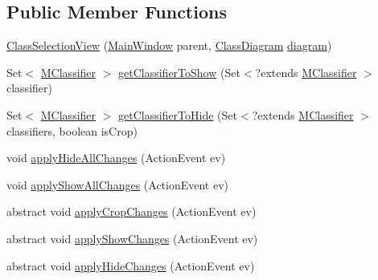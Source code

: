\subsection*{Public Member Functions}
\begin{DoxyCompactItemize}
\item 
\hyperlink{classorg_1_1tzi_1_1use_1_1gui_1_1views_1_1selection_1_1_class_selection_view_a13fa891c0471a910fcb2ef951f3b9fdc}{Class\-Selection\-View} (\hyperlink{classorg_1_1tzi_1_1use_1_1gui_1_1main_1_1_main_window}{Main\-Window} parent, \hyperlink{classorg_1_1tzi_1_1use_1_1gui_1_1views_1_1diagrams_1_1classdiagram_1_1_class_diagram}{Class\-Diagram} \hyperlink{classorg_1_1tzi_1_1use_1_1gui_1_1views_1_1selection_1_1_class_selection_view_a8cc2a534904dde3a8f6bebf8c646934d}{diagram})
\item 
Set$<$ \hyperlink{interfaceorg_1_1tzi_1_1use_1_1uml_1_1mm_1_1_m_classifier}{M\-Classifier} $>$ \hyperlink{classorg_1_1tzi_1_1use_1_1gui_1_1views_1_1selection_1_1_class_selection_view_a67daf810e72ee77dc522fabf072445b7}{get\-Classifier\-To\-Show} (Set$<$?extends \hyperlink{interfaceorg_1_1tzi_1_1use_1_1uml_1_1mm_1_1_m_classifier}{M\-Classifier} $>$ classifier)
\item 
Set$<$ \hyperlink{interfaceorg_1_1tzi_1_1use_1_1uml_1_1mm_1_1_m_classifier}{M\-Classifier} $>$ \hyperlink{classorg_1_1tzi_1_1use_1_1gui_1_1views_1_1selection_1_1_class_selection_view_a1d24c35bf5715cae1c9c26c4645ad18b}{get\-Classifier\-To\-Hide} (Set$<$?extends \hyperlink{interfaceorg_1_1tzi_1_1use_1_1uml_1_1mm_1_1_m_classifier}{M\-Classifier} $>$ classifiers, boolean is\-Crop)
\item 
void \hyperlink{classorg_1_1tzi_1_1use_1_1gui_1_1views_1_1selection_1_1_class_selection_view_a7ba19e87f6b4ef6ab4d051c7828748d5}{apply\-Hide\-All\-Changes} (Action\-Event ev)
\item 
void \hyperlink{classorg_1_1tzi_1_1use_1_1gui_1_1views_1_1selection_1_1_class_selection_view_abba8d1dfdfb2dc5ea4936cf0819bc72a}{apply\-Show\-All\-Changes} (Action\-Event ev)
\item 
abstract void \hyperlink{classorg_1_1tzi_1_1use_1_1gui_1_1views_1_1selection_1_1_class_selection_view_a544583de8e5dbefab3d87aa8379e1d37}{apply\-Crop\-Changes} (Action\-Event ev)
\item 
abstract void \hyperlink{classorg_1_1tzi_1_1use_1_1gui_1_1views_1_1selection_1_1_class_selection_view_a5a0ce739eb3270803d195eaac588750d}{apply\-Show\-Changes} (Action\-Event ev)
\item 
abstract void \hyperlink{classorg_1_1tzi_1_1use_1_1gui_1_1views_1_1selection_1_1_class_selection_view_a133fa1b754e10940fc64fe73b874aaa1}{apply\-Hide\-Changes} (Action\-Event ev)

\end{DoxyCompactItemize}
